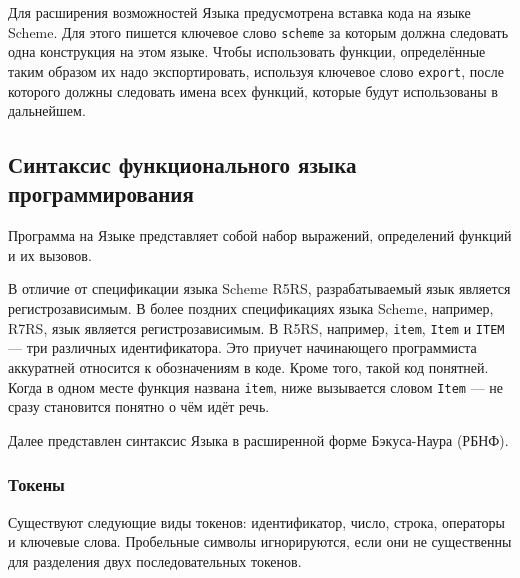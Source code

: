         

        Для расширения возможностей Языка предусмотрена вставка кода на языке Scheme.
        Для этого пишется ключевое слово \verb$scheme$ за которым должна следовать одна конструкция на этом языке.
        Чтобы использовать функции, определённые таким образом их надо экспортировать, используя ключевое слово \verb$export$, после которого должны следовать имена всех функций, которые будут использованы в дальнейшем.

    \subsection{Синтаксис функционального языка программирования}
        Программа на Языке представляет собой набор выражений, определений функций и их вызовов.
        
        В отличие от спецификации языка Scheme R5RS, разрабатываемый язык является регистрозависимым.
        В более поздних спецификациях языка Scheme, например, R7RS, язык является регистрозависимым.
        В R5RS, например, \verb$item$, \verb$Item$ и \verb$ITEM$ --- три различных идентификатора.
        Это приучет начинающего программиста аккуратней относится к обозначениям в коде.
        Кроме того, такой код понятней.
        Когда в одном месте функция названа \verb$item$, ниже вызывается словом \verb$Item$ --- не сразу становится понятно о чём идёт речь.

        Далее представлен синтаксис Языка в расширенной форме Бэкуса-Наура (РБНФ)\cite{skor}.

        \subsubsection{Токены}
            Существуют следующие виды токенов: идентификатор, число, строка, операторы и ключевые слова.
            Пробельные символы игнорируются, если они не существенны для разделения двух последовательных токенов.

